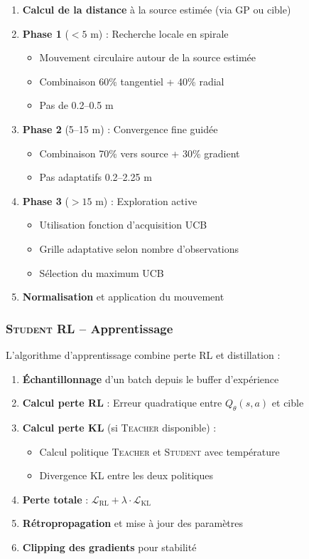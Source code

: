 \documentclass[12pt,a4paper]{article}
\newcommand{\teacher}{\textsc{Teacher}}
\newcommand{\student}{\textsc{Student}}
\newcommand{\gp}{\textsc{GP}}
\newcommand{\rl}{\textsc{RL}}
\begin{document}
\begin{enumerate}
    \item \textbf{Calcul de la distance} à la source estimée (via \gp{} ou cible)
    \item \textbf{Phase 1} ($< 5$ m) : Recherche locale en spirale
    \begin{itemize}
        \item Mouvement circulaire autour de la source estimée
        \item Combinaison 60\% tangentiel + 40\% radial
        \item Pas de 0.2--0.5 m
    \end{itemize}
    \item \textbf{Phase 2} (5--15 m) : Convergence fine guidée
    \begin{itemize}
        \item Combinaison 70\% vers source + 30\% gradient
        \item Pas adaptatifs 0.2--2.25 m
    \end{itemize}
    \item \textbf{Phase 3} ($> 15$ m) : Exploration active
    \begin{itemize}
        \item Utilisation fonction d'acquisition UCB
        \item Grille adaptative selon nombre d'observations
        \item Sélection du maximum UCB
    \end{itemize}
    \item \textbf{Normalisation} et application du mouvement
\end{enumerate}

\subsubsection{\student{} \rl{} -- Apprentissage}

L'algorithme d'apprentissage combine perte \rl{} et distillation :

\begin{enumerate}
    \item \textbf{Échantillonnage} d'un batch depuis le buffer d'expérience
    \item \textbf{Calcul perte \rl{}} : Erreur quadratique entre $Q_\theta(s, a)$ et cible
    \item \textbf{Calcul perte KL} (si \teacher{} disponible) :
    \begin{itemize}
        \item Calcul politique \teacher{} et \student{} avec température
        \item Divergence KL entre les deux politiques
    \end{itemize}
    \item \textbf{Perte totale} : $\mathcal{L}_{\text{RL}} + \lambda \cdot \mathcal{L}_{\text{KL}}$
    \item \textbf{Rétropropagation} et mise à jour des paramètres
    \item \textbf{Clipping des gradients} pour stabilité
\end{enumerate}
\end{document}
